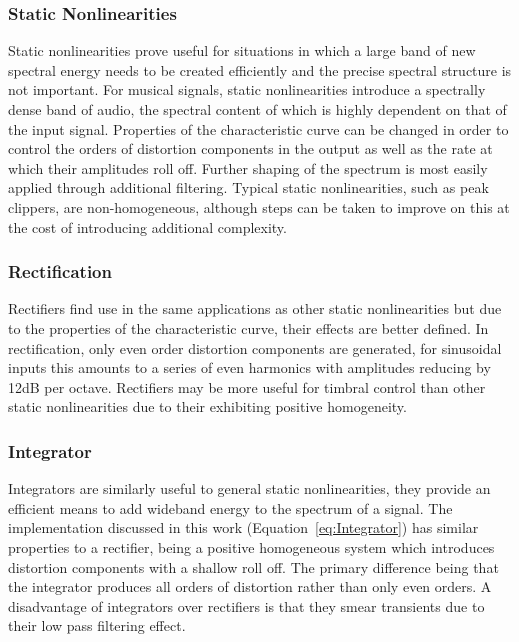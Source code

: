 		\subsubsection*{Static Nonlinearities}
			Static nonlinearities prove useful for situations in which a large band of new spectral energy
			needs to be created efficiently and the precise spectral structure is not important. For musical
			signals, static nonlinearities introduce a spectrally dense band of audio, the spectral content of
			which is highly dependent on that of the input signal. Properties of the characteristic curve can
			be changed in order to control the orders of distortion components in the output as well as the
			rate at which their amplitudes roll off. Further shaping of the spectrum is most easily applied
			through additional filtering. Typical static nonlinearities, such as peak clippers, are
			non-homogeneous, although steps can be taken to improve on this at the cost of introducing
			additional complexity.
			
		\subsubsection*{Rectification}
			Rectifiers find use in the same applications as other static nonlinearities but due to the
			properties of the characteristic curve, their effects are better defined. In rectification, only
			even order distortion components are generated, for sinusoidal inputs this amounts to a series of
			even harmonics with amplitudes reducing by 12dB per octave. Rectifiers may be more useful for
			timbral control than other static nonlinearities due to their exhibiting positive homogeneity.

		\subsubsection*{Integrator}
			Integrators are similarly useful to general static nonlinearities, they provide an efficient means
			to add wideband energy to the spectrum of a signal. The implementation discussed in this work
			(Equation~\ref{eq:Integrator}) has similar properties to a rectifier, being a positive homogeneous
			system which introduces distortion components with a shallow roll off. The primary difference being
			that the integrator produces all orders of distortion rather than only even orders. A disadvantage
			of integrators over rectifiers is that they smear transients due to their low pass filtering
			effect.

